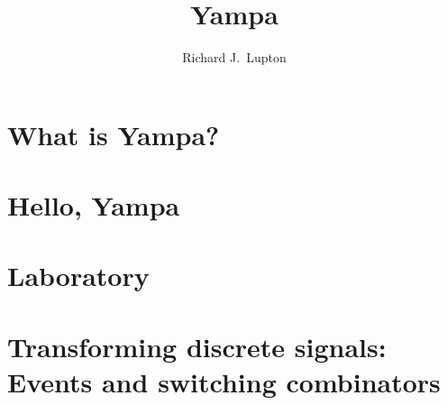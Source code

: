 \documentclass{report}
\begin{document}
\title{Yampa}
\author{Richard J.\ Lupton}
\lstset{language=Haskell, captionpos=b, basicstyle=\footnotesize\ttfamily, keywordstyle=\bfseries, commentstyle=\itshape, breaklines=true}
\linespread{1.45}

\newcommand{\hask}[1]{\texttt{#1}}
\newcommand{\yampaMain}{{\hask{yampaMain}} }

\maketitle

\chapter{What is Yampa?}


\chapter{Hello, Yampa}


\chapter{Laboratory}


\chapter{Transforming discrete signals: Events and switching combinators}

\end{document}
